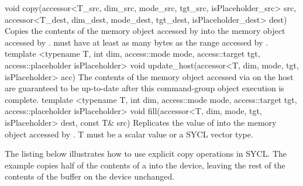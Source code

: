    {void copy(accessor<T_src, dim_src, mode_src, tgt_src, isPlaceholder_src> src, accessor<T_dest, dim_dest, mode_dest, tgt_dest, isPlaceholder_dest> dest)}
    { Copies the contents of the memory object accessed by 
      into the memory object accessed by .
       must have at least as many bytes as the
      range accessed by .}
  \addRowTwoL
    {template <typename T, int dim, access::mode mode, access::target tgt, access::placeholder isPlaceholder>}
    {void update_host(accessor<T, dim, mode, tgt, isPlaceholder> acc)}
    { The contents of the memory object accessed via 
      on the host are guaranteed to be up-to-date after this
      \gls{command-group} object execution is complete.}
  \addRowThreeL
    {template <typename T, int dim, access::mode mode, access::target tgt, access::placeholder isPlaceholder>}
    {void fill(accessor<T, dim, mode, tgt, isPlaceholder> dest,}
    {          const T\& src)}
    {Replicates the value of  into the
      memory object accessed by .
      T must be a scalar value or a SYCL vector type.
    }

\completeTable

The listing below illustrates how to use explicit copy
operations in SYCL. The example copies half of the contents of
a  into the device, leaving the rest of the
contents of the buffer on the device unchanged.




